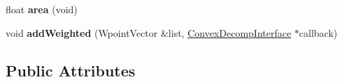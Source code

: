 \begin{DoxyCompactItemize}
\item 
\hypertarget{class_convex_decomposition_1_1_c_tri_afc6c0436129c1cada2d93fac9978489f}{float {\bfseries area} (void)}\label{class_convex_decomposition_1_1_c_tri_afc6c0436129c1cada2d93fac9978489f}

\item 
\hypertarget{class_convex_decomposition_1_1_c_tri_a909eeb8f1886e53b449041767a81906b}{void {\bfseries add\+Weighted} (Wpoint\+Vector \&list, \hyperlink{class_convex_decomposition_1_1_convex_decomp_interface}{Convex\+Decomp\+Interface} $\ast$callback)}\label{class_convex_decomposition_1_1_c_tri_a909eeb8f1886e53b449041767a81906b}

\end{DoxyCompactItemize}
\subsection*{Public Attributes}
